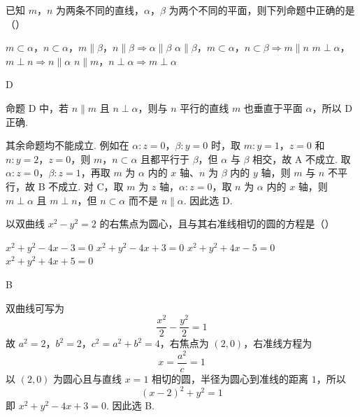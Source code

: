 \begin{problem}
已知 \(m\)，\(n\) 为两条不同的直线，\(\alpha\)，\(\beta\) 为两个不同的平面，则下列命题中正确的是（\quad）

\choices
    {\(m \subset \alpha\)，\(n \subset \alpha\)，\(m \parallel \beta\)，\(n \parallel \beta \Rightarrow \alpha \parallel \beta\)}
    {\(\alpha \parallel \beta\)，\(m \subset \alpha\)，\(n \subset \beta \Rightarrow m \parallel n\)}
    {\(m \perp \alpha\)，\(m \perp n \Rightarrow n \parallel \alpha\)}
    {\(n \parallel m\)，\(n \perp \alpha \Rightarrow m \perp \alpha\)}
\end{problem}

\begin{answer}
D
\end{answer}

\begin{solution}
命题 D 中，若 \(n\parallel m\) 且 \(n\perp\alpha\)，则与 \(n\) 平行的直线 \(m\) 也垂直于平面 \(\alpha\)，所以 D 正确.

其余命题均不能成立. 例如在 \(\alpha:z=0\)，\(\beta:y=0\) 时，取 \(m:y=1\)，\(z=0\) 和 \(n:y=2\)，\(z=0\)，则 \(m\)，\(n\subset\alpha\) 且都平行于 \(\beta\)，但 \(\alpha\) 与 \(\beta\) 相交，故 A 不成立. 取 \(\alpha:z=0\)，\(\beta:z=1\)，再取 \(m\) 为 \(\alpha\) 内的 \(x\) 轴、\(n\) 为 \(\beta\) 内的 \(y\) 轴，则 \(m\) 与 \(n\) 不平行，故 B 不成立. 对 C，取 \(m\) 为 \(z\) 轴，\(\alpha:z=0\)，取 \(n\) 为 \(\alpha\) 内的 \(x\) 轴，则 \(m\perp\alpha\) 且 \(m\perp n\)，但 \(n\subset\alpha\) 而不是 \(n\parallel\alpha\). 因此选 D.
\end{solution}

\begin{problem}
以双曲线 \(x^2 - y^2 = 2\) 的右焦点为圆心，且与其右准线相切的圆的方程是（\quad）

\choices
    {\(x^2 + y^2 - 4x - 3 = 0\)}
    {\(x^2 + y^2 - 4x + 3 = 0\)}
    {\(x^2 + y^2 + 4x - 5 = 0\)}
    {\(x^2 + y^2 + 4x + 5 = 0\)}
\end{problem}

\begin{answer}
B
\end{answer}

\begin{solution}
双曲线可写为
\[
\frac{x^2}{2}-\frac{y^2}{2}=1
\]
故 \(a^2=2\)，\(b^2=2\)，\(c^2=a^2+b^2=4\)，右焦点为 \((2,0)\)，右准线方程为
\[
x=\frac{a^2}{c}=1
\]
以 \((2,0)\) 为圆心且与直线 \(x=1\) 相切的圆，半径为圆心到准线的距离 \(1\)，所以
\[
(x-2)^2+y^2=1
\]
即 \(x^2+y^2-4x+3=0\). 因此选 B.
\end{solution}


